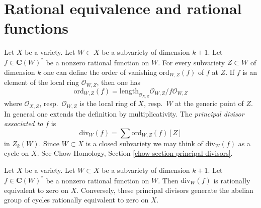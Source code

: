 \section{Rational equivalence and rational functions}
\label{section-alternative}

\noindent
Let $X$ be a variety. Let $W \subset X$ be a subvariety
of dimension $k + 1$. Let $f \in \mathbf{C}(W)^*$ be a nonzero rational
function on $W$. For every subvariety $Z \subset W$ of dimension $k$
one can define the order of vanishing $\text{ord}_{W, Z}(f)$ of $f$ at
$Z$. If $f$ is an element of the local ring $\mathcal{O}_{W, Z}$,
then one has
$$
\text{ord}_{W, Z}(f) =
\text{length}_{\mathcal{O}_{X, Z}} \mathcal{O}_{W, Z}/f\mathcal{O}_{W, Z}
$$
where $\mathcal{O}_{X, Z}$, resp.\ $\mathcal{O}_{W, Z}$ is the
local ring of $X$, resp.\ $W$ at the generic point of $Z$. In general one
extends the definition by multiplicativity. The {\it principal divisor
associated to $f$} is
$$
\text{div}_W(f) = \sum \text{ord}_{W, Z}(f)[Z]
$$
in $Z_k(W)$. Since $W \subset X$ is a closed subvariety we may think
of $\text{div}_W(f)$ as a cycle on $X$.
See Chow Homology, Section \ref{chow-section-principal-divisors}.

\begin{lemma}
\label{lemma-rational-equivalence}
Let $X$ be a variety. Let $W \subset X$ be a subvariety
of dimension $k + 1$. Let $f \in \mathbf{C}(W)^*$ be a nonzero rational
function on $W$. Then $\text{div}_W(f)$ is rationally equivalent to zero on
$X$. Conversely, these principal divisors generate the abelian group of
cycles rationally equivalent to zero on $X$.
\end{lemma}


